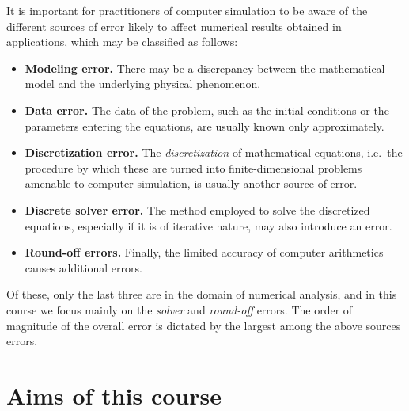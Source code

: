 It is important for practitioners of computer simulation to be aware of the different sources of error likely to affect numerical results obtained in applications,
which may be classified as follows:
\begin{itemize}
    \item
        \textbf{Modeling error.}
        There may be a discrepancy between the mathematical model and the underlying physical phenomenon.

    \item
        \textbf{Data error.}
        The data of the problem,
        such as the initial conditions or the parameters entering the equations,
        are usually known only approximately.

    \item
        \textbf{Discretization error.}
        The \emph{discretization} of mathematical equations,
        i.e.\ the procedure by which these are turned into finite-dimensional problems amenable to computer simulation,
        is usually another source of error.

    \item
        \textbf{Discrete solver error.}
        The method employed to solve the discretized equations,
        especially if it is of iterative nature,
        may also introduce an error.

    \item
        \textbf{Round-off errors.}
        Finally, the limited accuracy of computer arithmetics causes additional errors.
\end{itemize}
Of these,
only the last three are in the domain of numerical analysis,
and in this course we focus mainly on the \emph{solver} and \emph{round-off} errors.
The order of magnitude of the overall error is dictated by the largest among the above sources errors.

\section*{Aims of this course}%
\label{sec:aims_of_this_course}

